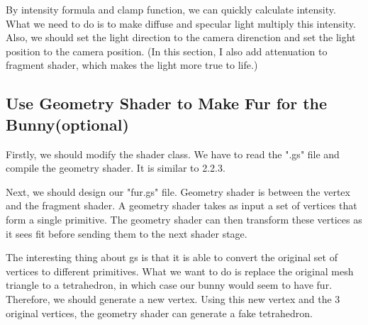 \documentclass[acmtog]{acmart}
\begin{document}
By intensity formula and clamp function, we can quickly calculate intensity. What we need to do is to make diffuse and specular light multiply this intensity.
Also, we should set the light direction to the camera direnction and set the light position to the camera position.
(In this section, I also add attenuation to fragment shader, which makes the light more true to life.)
\subsection{Use Geometry Shader to Make Fur for the Bunny(optional)}
\quad
Firstly, we should modify the shader class. We have to read the ".gs" file and compile the geometry shader. It is similar to 2.2.3. 

Next, we should design our "fur.gs" file. 
Geometry shader is between the vertex and the fragment shader.
A geometry shader takes as input a set of vertices that form a single primitive. The geometry shader can then transform these vertices as it sees fit before sending them to the next shader stage. 

The interesting thing about gs is that it is able to convert the original set of vertices to different primitives.
What we want to do is replace the original mesh triangle to a tetrahedron, in which case our bunny would seem to have fur.
Therefore, we should generate a new vertex. Using this new vertex and the 3 original vertices, the geometry shader can generate a fake tetrahedron.
\end{document}
